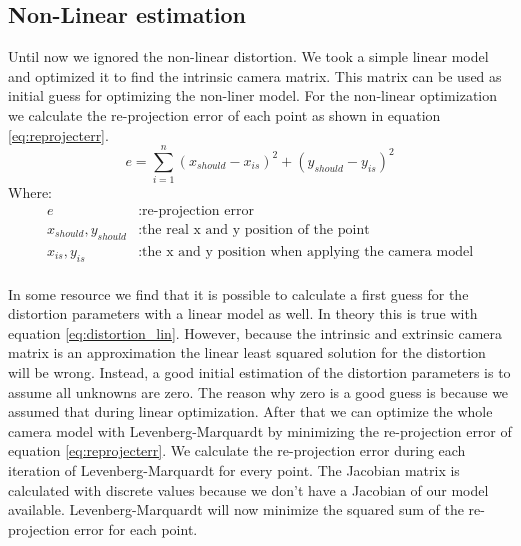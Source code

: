 \documentclass[11pt,a4paper,titlepage,oneside]{report}
\begin{document}
\subsection{Non-Linear estimation}\label{sec:nonlinear_est}
Until now we ignored the non-linear distortion. We took a simple linear model and optimized it to find the intrinsic camera matrix. This matrix can be used as initial guess for optimizing the non-liner model. For the non-linear optimization we calculate the re-projection error of each point as shown in equation \ref{eq:reprojecterr}. 
\begin{equation}\label{eq:reprojecterr}
	e=\sum\limits_{i=1}^n(x_{should}-x_{is})^2 +(y_{should}-y_{is})^2
\end{equation}
Where:
\begin{align*}
	e												&: \text{re-projection error}\\
	x_{should},y_{should}		&: \text{the real x and y position of the point}\\
	x_{is},y_{is}						&: \text{the x and y position when applying the camera model}\\
\end{align*}

In some resource we find that it is possible to calculate a first guess for the distortion parameters with a linear model as well. In theory this is true with equation \ref{eq:distortion_lin}.  However, because the intrinsic and extrinsic camera matrix is an approximation the linear least squared solution for the distortion will be wrong. Instead, a good initial estimation of the distortion parameters is to assume all unknowns are zero. The reason why zero is a good guess is because we assumed that during linear optimization. After that we can optimize the whole camera model with Levenberg-Marquardt by minimizing the re-projection error of equation \ref{eq:reprojecterr}. We calculate the re-projection error during each iteration of Levenberg-Marquardt for every point. The Jacobian matrix is calculated with discrete values because we don't have a Jacobian of our model available. Levenberg-Marquardt will now minimize the squared sum of the re-projection error for each point.
\end{document}
